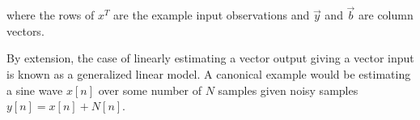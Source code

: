 where the rows of $x^{T}$ are the example input observations and $\vec{y}$ and $\vec{b}$ are column vectors.

By extension, the case of linearly estimating a vector output giving a vector input is known as a generalized linear model. A canonical example would be estimating a sine wave $x[n]$ over some number of $N$ samples given noisy samples $y[n]=x[n]+N[n]$.








